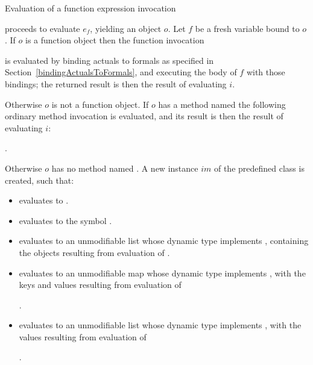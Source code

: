 \documentclass[makeidx]{article}
\begin{document}
{\LMHash{}%
Evaluation of a function expression invocation

\noindent
{}

\noindent
proceeds to evaluate $e_f$, yielding an object $o$.
Let $f$ be a fresh variable bound to $o$.
If $o$ is a function object then the function invocation

\noindent
{}

\noindent
is evaluated by binding actuals to formals
as specified in Section~\ref{bindingActualsToFormals},
and executing the body of $f$ with those bindings;
the returned result is then the result of evaluating $i$.

\LMHash{}%
Otherwise $o$ is not a function object.
If $o$ has a method named \CALL{}
the following ordinary method invocation is evaluated,
and its result is then the result of evaluating $i$:

\noindent
{}.

\LMHash{}%
Otherwise $o$ has no method named \CALL.
A new instance $im$ of the predefined class  is created,
such that:
\begin{itemize}
\item {} evaluates to \TRUE.
\item {} evaluates to the symbol .
\item {} evaluates to an unmodifiable list
  whose dynamic type implements ,
  containing the objects resulting from evaluation of
  .
\item {} evaluates to an unmodifiable map
  whose dynamic type implements ,
  with the keys and values resulting from evaluation of

  .
\item {} evaluates to an unmodifiable list
  whose dynamic type implements ,
  with the values resulting from evaluation of

  .
\end{itemize}

}
\end{document}
